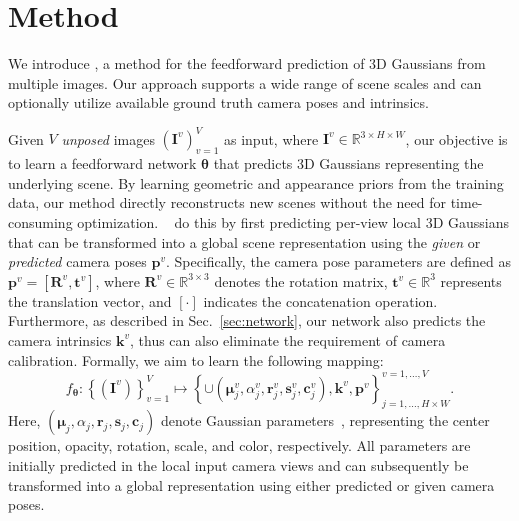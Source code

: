 
\vspace{-1mm}
\section{Method}
\vspace{-1mm}

We introduce \ourmethod, a method for the feedforward prediction of 3D Gaussians from multiple images. Our approach supports a wide range of scene scales and can optionally utilize available ground truth camera poses and intrinsics.

Given $V$ \textit{unposed} images $(\boldsymbol{I}^v)_{v=1}^V$ as input, where $\boldsymbol{I}^v \in \mathbb{R}^{3 \times H \times W}$, our objective is to learn a feedforward network $\boldsymbol{\theta}$ that predicts 3D Gaussians representing the underlying scene. By learning geometric and appearance priors from the training data, our method directly reconstructs new scenes without the need for time-consuming optimization.
\ourmethod~ do this by first predicting per-view local 3D Gaussians that can be transformed into a global scene representation using the \textit{given} or \textit{predicted} camera poses $\boldsymbol{p}^v$. Specifically, the camera pose parameters are defined as $\boldsymbol{p}^v = [\boldsymbol{R}^v, \boldsymbol{t}^v]$, where $\boldsymbol{R}^v \in \mathbb{R}^{3\times3}$ denotes the rotation matrix, $\boldsymbol{t}^v \in \mathbb{R}^3$ represents the translation vector, and $[\cdot]$ indicates the concatenation operation. Furthermore, as described in Sec.~\ref{sec:network}, our network also predicts the camera intrinsics $\boldsymbol{k}^v$, thus can also eliminate the requirement of camera calibration.
Formally, we aim to learn the following mapping:
\begin{equation}
    f_{\boldsymbol{\theta}}:\left\{\left(\boldsymbol{I}^v\right)\right\}_{v=1}^V \mapsto\left\{ \cup   \left(\boldsymbol{\mu}_j^v, \alpha_j^v, \boldsymbol{r}_j^v, \boldsymbol{s}_j^v, \boldsymbol{c}_j^v\right) , \boldsymbol{k}^v, \boldsymbol{p}^v\right\}_{j=1,\dots,H \times W}^{v=1,\dots,V}.
\label{eq:mapping}
\end{equation}
Here, $\left(\boldsymbol{\mu}_j, \alpha_j, \boldsymbol{r}_j, \boldsymbol{s}_j, \boldsymbol{c}_j\right)$ denote Gaussian parameters~\citep{3dgs}, representing the center position, opacity, rotation, scale, and color, respectively. All parameters are initially predicted in the local input camera views and can subsequently be transformed into a global representation using either predicted or given camera poses.

